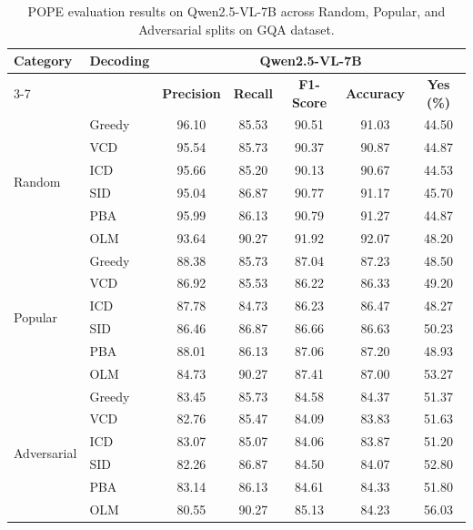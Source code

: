 \documentclass[11pt]{article}
\begin{document}
\setcounter{table}{8}

\begin{table}[ht]
\centering
\caption{POPE evaluation results on Qwen2.5-VL-7B across Random, Popular, and Adversarial splits on GQA dataset.}
\label{tab:pope_results_13b}

\setlength{\tabcolsep}{6pt}
\renewcommand{\arraystretch}{1.1}

\begin{tabular}{l|l|ccccc}
\toprule
\multirow{2}{*}{\textbf{Category}} &
\multirow{2}{*}{\textbf{Decoding}}
& \multicolumn{5}{c}{\textbf{Qwen2.5-VL-7B}} \\
\cmidrule(lr){3-7}
&
& \textbf{Precision}
& \textbf{Recall}
& \textbf{F1-Score}
& \textbf{Accuracy}
& \textbf{Yes (\%)} \\
\midrule

\multirow{6}{*}{Random}
& Greedy & 96.10 & 85.53 & 90.51 & 91.03 & 44.50 \\
& VCD    & 95.54 & 85.73 & 90.37 & 90.87 & 44.87 \\
& ICD    & 95.66 & 85.20 & 90.13 & 90.67 & 44.53 \\
& SID    & 95.04 & 86.87 & 90.77 & 91.17 & 45.70 \\
& PBA    & 95.99 & 86.13 & 90.79 & 91.27 & 44.87 \\
& OLM    & 93.64 & 90.27 & 91.92 & 92.07 & 48.20 \\
\midrule

\multirow{6}{*}{Popular}
& Greedy & 88.38 & 85.73 & 87.04 & 87.23 & 48.50 \\
& VCD    & 86.92 & 85.53 & 86.22 & 86.33 & 49.20 \\
& ICD    & 87.78 & 84.73 & 86.23 & 86.47 & 48.27 \\
& SID    & 86.46 & 86.87 & 86.66 & 86.63 & 50.23 \\
& PBA    & 88.01 & 86.13 & 87.06 & 87.20 & 48.93 \\
& OLM    & 84.73 & 90.27 & 87.41 & 87.00 & 53.27 \\
\midrule

\multirow{6}{*}{Adversarial}
& Greedy & 83.45 & 85.73 & 84.58 & 84.37 & 51.37 \\
& VCD    & 82.76 & 85.47 & 84.09 & 83.83 & 51.63 \\
& ICD    & 83.07 & 85.07 & 84.06 & 83.87 & 51.20 \\
& SID    & 82.26 & 86.87 & 84.50 & 84.07 & 52.80 \\
& PBA    & 83.14 & 86.13 & 84.61 & 84.33 & 51.80 \\
& OLM    & 80.55 & 90.27 & 85.13 & 84.23 & 56.03 \\
\bottomrule

\end{tabular}

\end{table}
\end{document}
